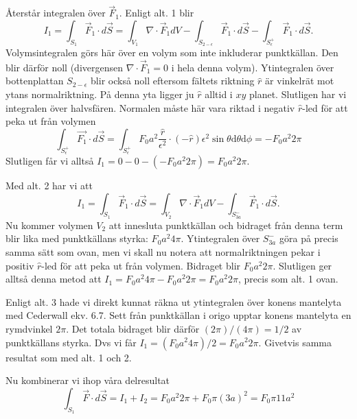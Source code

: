 \documentclass[%
oneside,                 %
final,                   %
10pt]{article}
\newenvironment{doconceexercise}{}{}
\begin{document}
\begin{doconceexercise}
Återstår integralen över $\vec{F}_1$. Enligt alt. 1 blir
\begin{equation}
\label{eq:GaussTot2}
I_1 = \int_{S_1} \vec{F}_1 \cdot d\vec{S} = \int_{V_1} \nabla \cdot \vec{F}_1 dV - \int_{S_{2-\epsilon}} \vec{F}_1 \cdot d\vec{S} - \int_{S^+_{\epsilon}} \vec{F}_1 \cdot d\vec{S}.
\end{equation}
Volymsintegralen görs här över en volym som inte inkluderar punktkällan. Den blir därför noll (divergensen $\nabla \cdot \vec{F}_1=0$ i hela denna volym). Ytintegralen över bottenplattan $S_{2-\epsilon}$ blir också noll eftersom fältets riktning $\hat{r}$ är vinkelrät mot ytans normalriktning. På denna yta ligger ju $\hat{r}$ alltid i $xy$ planet. Slutligen har vi integralen över halvsfären. Normalen måste här vara riktad i negativ $\hat{r}$-led för att peka ut från volymen
\begin{equation}
\int_{S^+_{\epsilon}} \vec{F_1} \cdot d\vec{S} = \int_{S^+_{\epsilon}} F_0 a^2 \frac{\hat{r}}{\epsilon^2} \cdot (-\hat{r}) \epsilon^2 \sin\theta \mbox{d}\theta \mbox{d}\phi= -F_0 a^2 2\pi 
\end{equation}
Slutligen får vi alltså $I_1 = 0 - 0 - (-F_0 a^2 2\pi ) = F_0 a^2 2\pi$.

Med alt. 2 har vi att
\begin{equation}
\label{eq:GaussTot3}
I_1 = \int_{S_1} \vec{F}_1 \cdot d\vec{S} = \int_{V_2} \nabla \cdot \vec{F}_1 dV - \int_{S^-_{3a}} \vec{F}_1 \cdot d\vec{S}.
\end{equation}
Nu kommer volymen $V_2$ att innesluta punktkällan och bidraget från denna term blir lika med punktkällans styrka: $F_0 a^2 4\pi$. Ytintegralen över $S^-_{3a}$ göra på precis samma sätt som ovan, men vi skall nu notera att normalriktningen pekar i positiv $\hat{r}$-led för att peka ut från volymen. Bidraget blir $F_0 a^2 2\pi$. Slutligen ger alltså denna metod att $I_1 = F_0 a^2 4\pi - F_0 a^2 2\pi = F_0 a^2 2\pi$, precis som alt. 1 ovan.

Enligt alt. 3 hade vi direkt kunnat räkna ut ytintegralen över konens mantelyta med Cederwall ekv. 6.7. Sett från punktkällan i origo upptar konens mantelyta en rymdvinkel $2\pi$. Det totala bidraget blir därför $(2\pi)/(4\pi) = 1/2$ av punktkällans styrka. Dvs vi får $I_1 = (F_0 a^2 4\pi)/2 = F_0 a^2 2\pi$. Givetvis samma resultat som med alt. 1 och 2.

Nu kombinerar vi ihop våra delresultat
\begin{equation}
\int_{S_1} \vec{F} \cdot d\vec{S} = I_1 + I_2 = F_0 a^2 2\pi + F_0 \pi (3a)^2 = F_0 \pi 11 a^2
\end{equation}


\end{doconceexercise}
\end{document}
